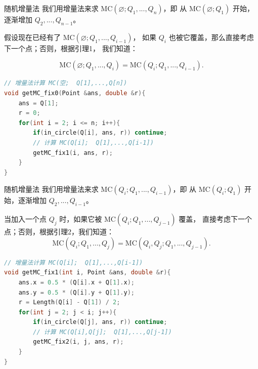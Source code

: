 \documentclass{beamer}
\begin{document}
\begin{frame}[fragile]{随机增量法}
    \footnotesize
    我们用增量法来求 $\text{MC}(\varnothing;Q_1,...,Q_{n})$，即
    从 $\text{MC}(\varnothing;Q_1)$ 开始，逐渐增加 $Q_2,...,Q_{n-1}$。

    \vspace{1em}\pause
    假设现在已经有了 $\text{MC}(\varnothing;Q_1,...,Q_{i-1})$，
    如果 $Q_i$ 也被它覆盖，那么直接考虑下一个点；否则，根据引理1，
    我们知道：

    \begin{equation*}
        \text{MC}(\varnothing;Q_1,...,Q_{i})=\text{MC}(Q_i;Q_1,...,Q_{i-1}).
    \end{equation*}

    \pause
    \begin{lstlisting}[language=c++]
// 增量法计算 MC(空;  Q[1],...,Q[n])
void getMC_fix0(Point &ans, double &r){
    ans = Q[1];
    r = 0;
    for(int i = 2; i <= n; i++){
        if(in_circle(Q[i], ans, r)) continue;
        // 计算 MC(Q[i];  Q[1],...,Q[i-1])
        getMC_fix1(i, ans, r);
    }
}
    \end{lstlisting}
\end{frame}

\begin{frame}[fragile]{随机增量法}
    \footnotesize
    我们用增量法来求 $\text{MC}(Q_i;Q_1,...,Q_{i-1})$，即
    从 $\text{MC}(Q_i;Q_1)$ 开始，逐渐增加 $Q_2,...,Q_{i-1}$。

    \vspace{1em}\pause
    当加入一个点 $Q_j$ 时，如果它被 $\text{MC}(Q_i;Q_1,...,Q_{j-1})$ 覆盖，
    直接考虑下一个点；否则，根据引理2，我们知道：
    \begin{equation*}
        \text{MC}(Q_i;Q_1,...,Q_{j})=\text{MC}(Q_i,Q_j;Q_1,...,Q_{j-1}).
    \end{equation*}

    \pause
    \begin{lstlisting}[language=c++]
// 增量法计算 MC(Q[i];  Q[1],...,Q[i-1])
void getMC_fix1(int i, Point &ans, double &r){
    ans.x = 0.5 * (Q[i].x + Q[1].x);
    ans.y = 0.5 * (Q[i].y + Q[1].y);
    r = Length(Q[i] - Q[1]) / 2;
    for(int j = 2; j < i; j++){
        if(in_circle(Q[j], ans, r)) continue;
        // 计算 MC(Q[i],Q[j];  Q[1],...,Q[j-1])
        getMC_fix2(i, j, ans, r);
    }
}
    \end{lstlisting}
\end{frame}
\end{document}
